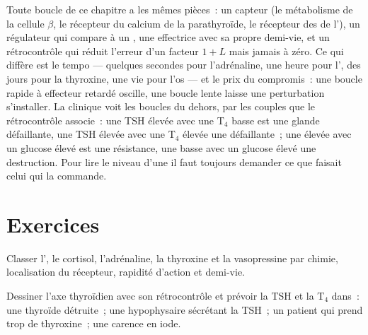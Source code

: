 \begin{remark}\label{rem:b3:endocrinology:control}
Toute boucle de ce chapitre a les mêmes pièces~: un capteur (le
métabolisme de la cellule $\beta$, le récepteur du calcium de la
parathyroïde, le récepteur des  de l'),
un régulateur qui compare à un , une  effectrice
avec sa propre demi-vie, et un rétrocontrôle qui réduit l'erreur d'un
facteur $1 + L$ mais jamais à zéro. Ce qui diffère est le tempo ---
quelques secondes pour l'adrénaline, une heure pour l', des
jours pour la thyroxine, une vie pour l'os --- et le prix du compromis~:
une boucle rapide à effecteur retardé oscille, une boucle lente laisse
une perturbation s'installer. La clinique voit les boucles du dehors,
par les couples que le rétrocontrôle associe~: une TSH élevée avec une
T$_{4}$ basse est une glande défaillante, une TSH élevée avec une
T$_{4}$ élevée une  défaillante~; une  élevée avec un
glucose élevé est une résistance, une  basse avec un glucose
élevé une destruction. Pour lire le niveau d'une  il faut
toujours demander ce que faisait celui qui la commande.
\end{remark}

\section{Exercices}

\begin{exercise}[$\star$]\label{exo:b3:endocrinology:1}
Classer l', le cortisol, l'adrénaline, la thyroxine et la
vasopressine par chimie, localisation du récepteur, rapidité d'action et
demi-vie.
\end{exercise}

\begin{exercise}[$\star$]\label{exo:b3:endocrinology:2}
Dessiner l'axe thyroïdien avec son rétrocontrôle et prévoir la TSH et la
T$_{4}$ dans~: une thyroïde détruite~; une  hypophysaire sécrétant
la TSH~; un patient qui prend trop de thyroxine~; une carence en iode.
\end{exercise}

